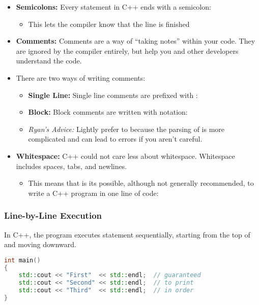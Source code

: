 \documentclass{article}
\begin{document}
\begin{itemize}
	\item \textbf{Semicolons:} Every statement in C++ ends with a semicolon:
	\begin{itemize}
		\item This lets the compiler know that the line is finished
	\end{itemize}
	\item \textbf{Comments:} Comments are a way of ``taking notes'' within your code. They are ignored by the compiler entirely, but help you and other developers understand the code.
	\item There are two ways of writing comments:
	\begin{itemize}
		\item \textbf{Single Line:} Single line comments are prefixed with \inlinecpp{//}:
		\item \textbf{Block:} Block comments are written with \inlinecpp{/* */} notation:
		\item \textsl{Ryan's Advice:} Lightly prefer \inlinecpp{//} to \inlinecpp{/* */} because the parsing of \inlinecpp{/* */} is more complicated and can lead to errors if you aren't careful.
	\end{itemize}
	\item \textbf{Whitespace:} C++ could not care less about whitespace. Whitespace includes spaces, tabs, and newlines.
	\begin{itemize}
		\item This means that is its possible, although not generally recommended, to write a C++ program in one line of code:
	\end{itemize}
\end{itemize}

\subsubsection{Line-by-Line Execution}

\noindent
In C++, the program executes statement sequentially, starting from the top of  and moving downward.

\begin{lstlisting}[language=C++]
int main()
{
	std::cout << "First"  << std::endl;  // guaranteed
	std::cout << "Second" << std::endl;  // to print
	std::cout << "Third"  << std::endl;  // in order
}
\end{lstlisting}
\end{document}
